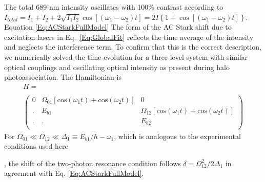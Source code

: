\label{App:ACStark}
The total 689-nm intensity oscillates with 100\% contrast according to
$I_{total}=I_1+I_2+2\sqrt{I_1I_2}\cos \left[(\omega_1-\omega_2)t \right]=2I\left\{1+\cos \left[(\omega_1-\omega_2)t \right]\right\}$.
Equation \ref{Eq:ACStarkFullModel}
The form of the AC Stark shift
due to excitation lasers in Eq.\ \ref{Eq:GlobalFit}
 reflects the time average of the intensity and neglects the interference term. To confirm that this is the correct description, we numerically solved the time-evolution for a three-level system with similar optical couplings and oscillating optical intensity as present during halo photoassociation. The Hamiltonian is
\begin{eqnarray}\label{Eq:ThreeLevelHamiltonian}
H= \hspace{3in} \\
 \nonumber\\
\left(
    \begin{array}{ccc}
      0 & \Omega_{01}\left[\mathrm{cos}(\omega_1 t)+ \mathrm{cos}(\omega_2 t)\right] & 0 \\
      . & E_{b1} & \Omega_{12}\left[\mathrm{cos}(\omega_1 t)+ \mathrm{cos}(\omega_2 t)\right] \\
      . & . & E_{b2} \\
    \end{array}
  \right)
\nonumber
\end{eqnarray}
For  $\Omega_{01}\ll \Omega_{12} \ll \Delta_{1}\equiv E_{b1}/\hbar-\omega_1$, which is analogous to the  experimental conditions used here

, the shift of the two-photon resonance condition follows $\delta={\Omega_{12}^{2}}/{2\Delta_{1}}$ in agreement with Eq. \ref{Eq:ACStarkFullModel}.




